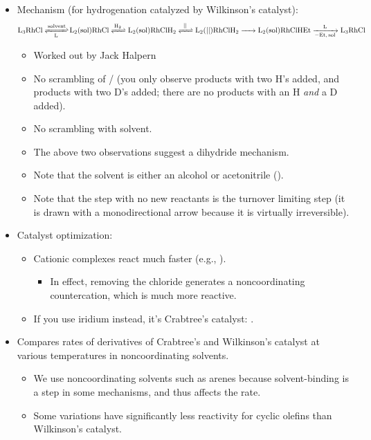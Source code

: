 \documentclass[../notes.tex]{subfiles}
\begin{document}
\begin{itemize}
\begin{itemize}
    \end{itemize}
    \item Mechanism (for hydrogenation catalyzed by Wilkinson's catalyst):
    \begin{equation*}
        \ce{L3RhCl <=>[{solvent}][L] L2({sol})RhCl <=>[H2] L2({sol})RhClH2 <=>[||] L2(||)RhClH2 -> L2({sol})RhClHEt ->[L][-Et, {sol}] L3RhCl}
    \end{equation*}
    \begin{itemize}
        \item Worked out by Jack Halpern
        \item No scrambling of / (you only observe products with two H's added, and products with two D's added; there are no products with an H \emph{and} a D added).
        \item No scrambling with solvent.
        \item The above two observations suggest a dihydride mechanism.
        \item Note that the solvent is either an alcohol or acetonitrile ().
        \item Note that the step with no new reactants is the turnover limiting step (it is drawn with a monodirectional arrow because it is virtually irreversible).
    \end{itemize}
    \item Catalyst optimization:
    \begin{itemize}
        \item Cationic  complexes react much faster (e.g., ).
        \begin{itemize}
            \item In effect, removing the chloride generates a noncoordinating countercation, which is much more reactive.
        \end{itemize}
        \item If you use iridium instead, it's Crabtree's catalyst: .
    \end{itemize}
    \item Compares rates of derivatives of Crabtree's and Wilkinson's catalyst at various temperatures in noncoordinating solvents.
    \begin{itemize}
        \item We use noncoordinating solvents such as arenes because solvent-binding is a step in some mechanisms, and thus affects the rate.
        \item Some variations have significantly less reactivity for cyclic olefins than Wilkinson's catalyst.

\end{itemize}
\end{itemize}
\end{document}
